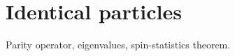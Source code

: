 \documentclass[oneside, 12pt, notitlepage]{book}
\begin{document}
\pagestyle{mynotespage}

\chapter{Identical particles}

Parity operator, eigenvalues, spin-statistics theorem.
\end{document}
